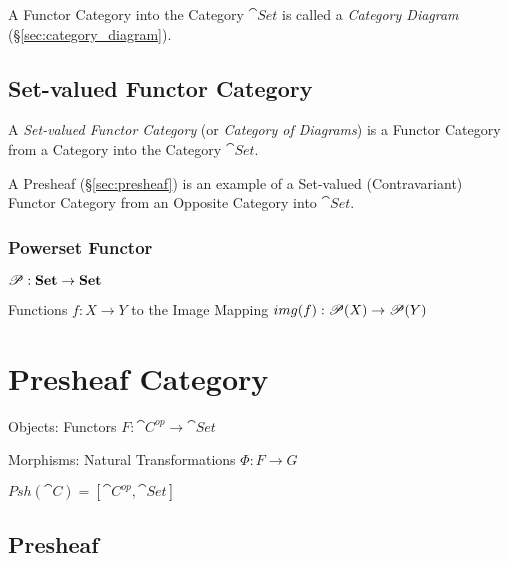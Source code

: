 A Functor Category into the Category $\cat{Set}$ is called a
\emph{Category Diagram} (\S\ref{sec:category_diagram}).



\subsection{Set-valued Functor Category}\label{sec:setvalued_functor}

A \emph{Set-valued Functor Category} (or \emph{Category of Diagrams})
is a Functor Category from a Category into the Category
$\cat{Set}$.

A Presheaf (\S\ref{sec:presheaf}) is an example of a Set-valued
(Contravariant) Functor Category from an Opposite Category into
$\cat{Set}$.



\subsubsection{Powerset Functor}\label{sec:powerset_functor}

$\mathscr{P} : \mathbf{Set} \rightarrow \mathbf{Set}$

Functions $f : X \rightarrow Y$ to the Image Mapping $img(f) :
\mathscr{P}(X) \rightarrow \mathscr{P}(Y)$



\section{Presheaf Category}\label{sec:presheaf_category}

Objects: Functors $F: \cat{C}^{op} \rightarrow \cat{Set}$

Morphisms: Natural Transformations $\Phi : F \rightarrow G$

$Psh(\cat{C}) = [\cat{C}^{op},\cat{Set}]$



\subsection{Presheaf}\label{sec:category_presheaf}

